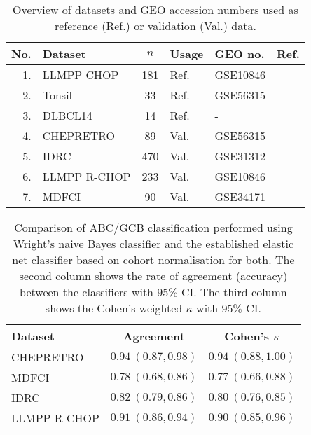 \documentclass[twocolumn]{bmcart}%
\begin{document}
\begin{backmatter}
\begin{table}[!h]%
{\footnotesize
\caption{Overview of datasets and GEO accession numbers used as reference (Ref.) or validation (Val.) data.}
\label{table:01}%
\begin{center}
\begin{tabular}{rlclll}
\hline
No. & Dataset & $n$ & Usage & GEO no. & Ref.
\\
\hline
1. & LLMPP CHOP & 181 & Ref. & GSE10846 & \citep{Lenz2008a}
\\
2. & Tonsil & 33 & Ref. & GSE56315 & \citep{DybkaerBoegsted2015}
\\
3. & DLBCL14 & 14 & Ref. & - & \citep{Falgreen2015}
\\
4. & CHEPRETRO & 89 & Val. & GSE56315 & \citep{DybkaerBoegsted2015}
\\
5. & IDRC & 470 & Val. & GSE31312 & \citep{Visco2012}
\\
6. & LLMPP R-CHOP & 233 & Val. & GSE10846 & \citep{Lenz2008a}
\\
7. & MDFCI & 90 & Val. & GSE34171 & \citep{Monti2012a}\\
\hline
\end{tabular}
\end{center}
}
\end{table}


\begin{table}[!h]%
{\small
\caption{Comparison of ABC/GCB classification performed using Wright's naive
Bayes classifier \citep{Wright2003} and the established elastic net classifier
based on cohort normalisation
for both. The second column shows the rate of agreement (accuracy) between the
classifiers with $95\%$ CI. The third column shows the Cohen's weighted
$\kappa$ with $95\%$ CI.\label{tab:ABCGCBclassifier}}
\begin{center}
\begin{tabular}{lll}
\hline
\multicolumn{1}{l}{Dataset}&\multicolumn{1}{c}{Agreement}&\multicolumn{1}{c}{Cohen's $\kappa$}\tabularnewline
\hline
CHEPRETRO&$0.94~(0.87, 0.98)$&$0.94~(0.88, 1.00)$\tabularnewline
MDFCI&$0.78~(0.68, 0.86)$&$0.77~(0.66, 0.88)$\tabularnewline
IDRC&$0.82~(0.79, 0.86)$&$0.80~(0.76, 0.85)$\tabularnewline
LLMPP R-CHOP&$0.91~(0.86, 0.94)$&$0.90~(0.85, 0.96)$\tabularnewline
\hline
\end{tabular}\end{center}}

\end{table}



\end{backmatter}
\end{document}
